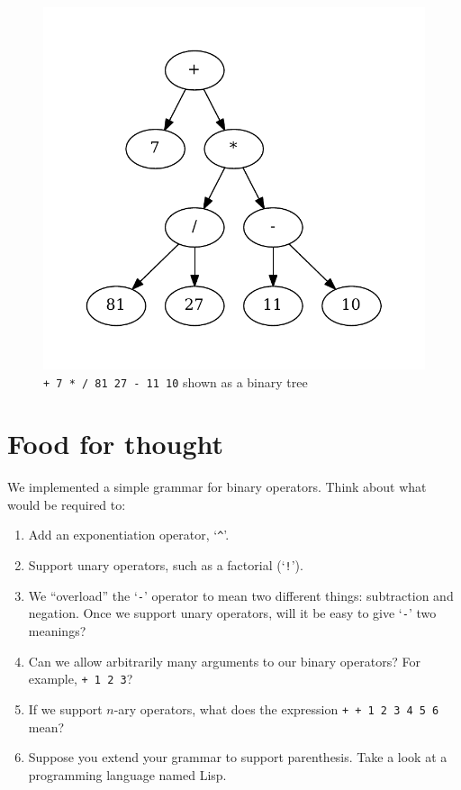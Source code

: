 \documentclass{book}
\begin{document}
\begin{figure}[ht]
  \centering
  \includegraphics[width=\textwidth,height=.95\textheight,keepaspectratio]{figures/polish}
  \caption{\texttt{+ 7 * / 81 27 - 11 10} shown as a binary tree}
  \label{polish}
\end{figure}

\section{Food for thought}
We implemented a simple grammar for binary operators. Think about what would be required to:

\begin{enumerate}
\item Add an exponentiation operator, `\texttt{\^}'.
\item Support unary operators, such as a factorial (`\texttt{!}').
\item We ``overload'' the `\texttt{-}' operator to mean two different things: subtraction and negation. Once we support unary operators, will it be easy to give `\texttt{-}' two meanings?
\item Can we allow arbitrarily many arguments to our binary operators? For example, \texttt{+ 1 2 3}?
\item If we support $n$-ary operators, what does the expression \texttt{+ + 1 2 3 4 5 6} mean?
\item Suppose you extend your grammar to support parenthesis. Take a look at a programming language named Lisp.
\end{enumerate}
\end{document}
